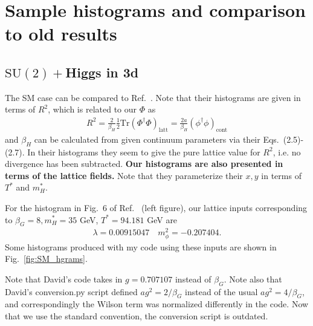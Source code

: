 \documentclass[11pt,a4paper]{article}
\newcommand\gr[1]{\mathrm{#1}}%
\newcommand\lauri[1]{{\color{myorange}#1}}
\begin{document}
\section{Sample histograms and comparison to old results}


\subsection{$\gr{SU(2)} + $Higgs in 3d}

The SM case can be compared to Ref.~\cite{Kajantie:1995kf}. Note that their histograms are given in terms of $R^2$, which is related to our $\Phi$ as
\begin{align}
\label{eq:kari_fields}
R^2 = \frac{2}{\beta_H} \frac12 \text{Tr} (\Phi^\dagger\Phi)_\text{latt} = \frac{2a}{\beta_H} (\phi^\dagger\phi)_\text{cont}
\end{align}
and $\beta_H$ can be calculated from given continuum parameters via their Eqs.~(2.5)-(2.7). In their histograms they seem to give the pure lattice value for $R^2$, i.e. no divergence has been subtracted. \textbf{Our histograms are also presented in terms of the lattice fields.} Note that they parameterize their $x,y$ in terms of $T^*$ and $m^*_H$.

For the histogram in Fig.~6 of Ref.~\cite{Kajantie:1995kf} (left figure), our lattice inputs corresponding to $\beta_G=8, m^*_H = 35$ GeV, $T^* = 94.181$ GeV are
\begin{align}
\label{eq:SM-inputs}
\lambda = 0.00915047 \quad m^2_\phi = -0.207404.
\end{align}
Some histograms produced with my code using these inputs are shown in Fig.~\ref{fig:SM_hgrams}.

\lauri{Note that David's code takes in $g = 0.707107$ instead of $\beta_G$. Note also that David's conversion.py script defined $a g^2 = 2/\beta_G$ instead of the usual $a g^2 = 4/\beta_G$, and correspondingly the Wilson term was normalized differently in the code. Now that we use the standard convention, the conversion script is outdated. }
\end{document}
